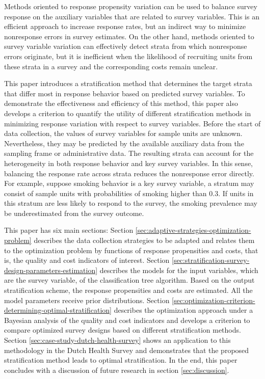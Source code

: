 \documentclass[12pt]{article}
\begin{document}
Methods oriented to response propensity variation can be used to balance survey response on the auxiliary variables that are related to survey variables.
This is an efficient approach to increase response rates, but an indirect way to minimize nonresponse errors in survey estimates.
On the other hand, methods oriented to survey variable variation can effectively detect strata from which nonresponse errors originate, but it is inefficient when the likelihood of recruiting units from these strata in a survey and the corresponding costs remain unclear.


This paper introduces a stratification method that determines the target strata that differ most in response behavior based on predicted survey variables.
To demonstrate the effectiveness and efficiency of this method, this paper also develops a criterion to quantify the utility of different stratification methods in minimizing response variation with respect to survey variables.
Before the start of data collection, the values of survey variables for sample units are unknown.
Nevertheless, they may be predicted by the available auxiliary data from the sampling frame or administrative data.
The resulting strata can account for the heterogeneity in both response behavior and key survey variables.
In this sense, balancing the response rate across strata reduces the nonresponse error directly.
For example, suppose smoking behavior is a key survey variable, a stratum may consist of sample units with probabilities of smoking higher than 0.3.
If units in this stratum are less likely to respond to the survey, the smoking prevalence may be underestimated from the survey outcome.
\par



This paper has six main sections:
Section \ref{sec:adaptive-strategies-optimization-problem} describes the data collection strategies to be adapted and relates them to the optimization problem by functions of response propensities and costs, that is, the quality and cost indicators of interest.
Section \ref{sec:stratification-survey-design-parameters-estimation} describes the models for the input variables, which are the survey variable, of the classification tree algorithm.
Based on the output stratification scheme, the response propensities and costs are estimated.
All the model parameters receive prior distributions.
Section \ref{sec:optimization-criterion-determining-optimal-stratification} describes the optimization approach under a Bayesian analysis of the quality and cost indicators and develops a criterion to compare optimized survey designs based on different stratification methods.
Section \ref{sec:case-study-dutch-health-survey} shows an application to this methodology in the Dutch Health Survey and demonstrates that the proposed stratification method leads to optimal stratification.
In the end, this paper concludes with a discussion of future research in section \ref{sec:discussion}.
\par
\end{document}
